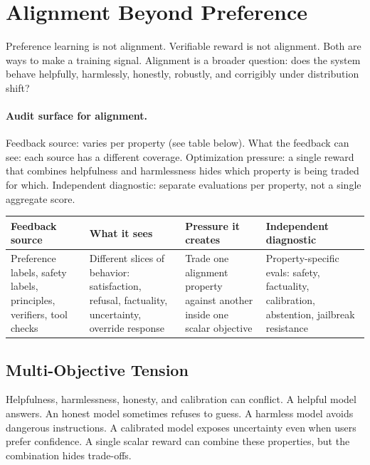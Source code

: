 \section{Alignment Beyond Preference}
\label{sec:alignment-beyond}

Preference learning is not alignment. Verifiable reward is not alignment. Both are ways to make a training signal. Alignment is a broader question: does the system behave helpfully, harmlessly, honestly, robustly, and corrigibly under distribution shift?

\paragraph{Audit surface for alignment.} Feedback source: varies per property (see table below). What the feedback can see: each source has a different coverage. Optimization pressure: a single reward that combines helpfulness and harmlessness hides which property is being traded for which. Independent diagnostic: separate evaluations per property, not a single aggregate score.

\begin{center}
\small
\begin{tabularx}{\textwidth}{@{}p{3.2cm}p{3.1cm}p{3.4cm}X@{}}
\toprule
\textbf{Feedback source} & \textbf{What it sees} & \textbf{Pressure it creates} & \textbf{Independent diagnostic} \\
\midrule
Preference labels, safety labels, principles, verifiers, tool checks & Different slices of behavior: satisfaction, refusal, factuality, uncertainty, override response & Trade one alignment property against another inside one scalar objective & Property-specific evals: safety, factuality, calibration, abstention, jailbreak resistance \\
\bottomrule
\end{tabularx}
\normalsize
\end{center}

\subsection{Multi-Objective Tension}

Helpfulness, harmlessness, honesty, and calibration can conflict. A helpful model answers. An honest model sometimes refuses to guess. A harmless model avoids dangerous instructions. A calibrated model exposes uncertainty even when users prefer confidence. A single scalar reward can combine these properties, but the combination hides trade-offs.

